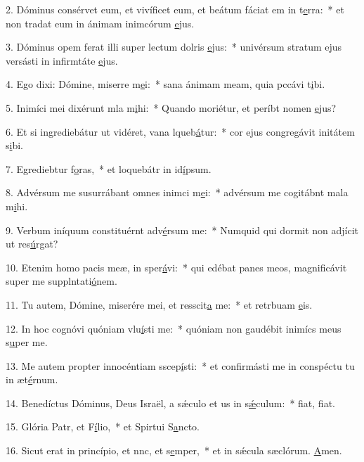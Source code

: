 2. Dóminus consérvet eum, et vivíficet eum, et beátum fáciat em in t\uline{e}rra:~* et non tradat eum in ánimam inimcórum \uline{e}jus.\par 
3. Dóminus opem ferat illi super lectum dolris \uline{e}jus:~* univérsum stratum ejus versásti in infirmtáte \uline{e}jus.\par 
4. Ego dixi: Dómine, miserre m\uline{e}i:~* sana ánimam meam, quia pccávi t\uline{i}bi.\par 
5. Inimíci mei dixérunt mla m\uline{i}hi:~* Quando moriétur, et períbt nomen \uline{e}jus?\par 
6. Et si ingrediebátur ut vidéret, vana lqueb\uline{á}tur:~* cor ejus congregávit initátem s\uline{i}bi.\par 
7. Egrediebtur f\uline{o}ras,~* et loquebátr in id\uline{í}psum.\par 
8. Advérsum me susurrábant omnes inimci m\uline{e}i:~* advérsum me cogitábnt mala m\uline{i}hi.\par 
9. Verbum iníquum constituérnt adv\uline{é}rsum me:~* Numquid qui dormit non adjícit ut res\uline{ú}rgat?\par 
10. Etenim homo pacis meæ, in  sper\uline{á}vi:~* qui edébat panes meos, magnificávit super me supplntati\uline{ó}nem.\par 
11. Tu autem, Dómine, miserére mei, et resscit\uline{a} me:~* et retrbuam \uline{e}is.\par 
12. In hoc cognóvi quóniam vlu\uline{í}sti me:~* quóniam non gaudébit inimícs meus s\uline{u}per me.\par 
13. Me autem propter innocéntiam sscep\uline{í}sti:~* et confirmásti me in conspéctu tu in æt\uline{é}rnum.\par 
14. Benedíctus Dóminus, Deus Israël, a sǽculo et us in s\uline{ǽ}culum:~* fiat, f\uline{i}at.\par 
15. Glória Patr, et F\uline{í}lio,~* et Spirtui S\uline{a}ncto.\par 
16. Sicut erat in princípio, et nnc, et s\uline{e}mper,~* et in sǽcula sæclórum. \uline{A}men.\par 
